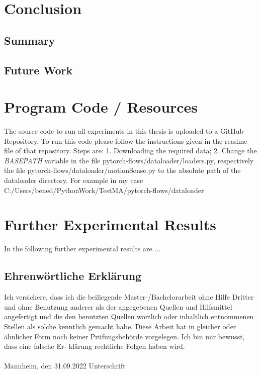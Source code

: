 \documentclass[11pt,titlepage,oneside,openany]{book}
\begin{document}
\chapter{Conclusion}
\label{cha:conclusion}


\section{Summary}
\label{sec:sum}


\section{Future Work}
\label{sec:future}






\appendix

\chapter{Program Code / Resources}
\label{cha:appendix-a}

The source code to run all experiments in this thesis is uploaded to a GitHub Repository. To run this code please follow the instructions given in the readme file of that repository. Steps are: 1. Downloading the required data; 2. Change the \emph{BASEPATH} variable in the file pytorch-flows\slash dataloader\slash loaders.py, respectively the file pytorch-flows\slash dataloader\slash motionSense.py to the absolute path of the dataloader directory. For example in my case C:\slash Users\slash bened\slash PythonWork\slash Test\textunderscore MA\slash pytorch-flows\slash dataloader

\chapter{Further Experimental Results}
\label{cha:appendix-b}

In the following further experimental results are ...


\newpage


\pagestyle{empty}


\section*{Ehrenw\"ortliche Erkl\"arung}
Ich versichere, dass ich die beiliegende Master-/Bachelorarbeit ohne Hilfe Dritter
und ohne Benutzung anderer als der angegebenen Quellen und Hilfsmittel
angefertigt und die den benutzten Quellen w\"ortlich oder inhaltlich
entnommenen Stellen als solche kenntlich gemacht habe. Diese Arbeit
hat in gleicher oder \"ahnlicher Form noch keiner Pr\"ufungsbeh\"orde
vorgelegen. Ich bin mir bewusst, dass eine falsche Er- kl\"arung rechtliche Folgen haben
wird.
\\
\\

\noindent
Mannheim, den 31.09.2022 \hspace{4cm} Unterschrift
\end{document}
